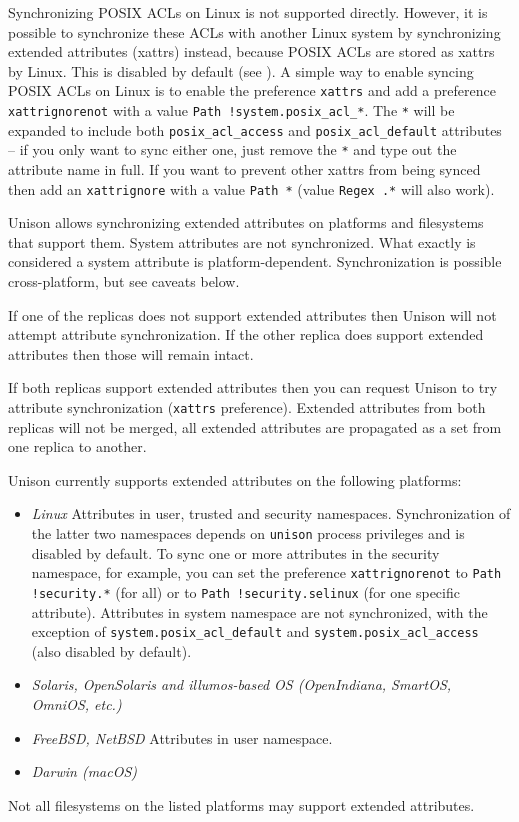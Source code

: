 \documentclass{article}
\begin{document}
Synchronizing POSIX ACLs on Linux is not supported directly. However, it is
possible to synchronize these ACLs with another Linux system by synchronizing
extended attributes (xattrs) instead, because POSIX ACLs are stored as xattrs
by Linux. This is disabled by default (see ).  A simple way to enable syncing POSIX ACLs on Linux is
to enable the preference \verb|xattrs| and add a preference
\verb|xattrignorenot| with a value \texttt{Path !system.posix\_acl\_*}.  The
\verb|*| will be expanded to include both \verb|posix_acl_access| and
\verb|posix_acl_default| attributes -- if you only want to sync either one,
just remove the \verb|*| and type out the attribute name in full.  If you want
to prevent other xattrs from being synced then add an \verb|xattrignore| with a
value \texttt{Path *} (value \texttt{Regex .*} will also work).



Unison allows synchronizing extended attributes on platforms and
filesystems that support them. System attributes are not synchronized.
What exactly is considered a system attribute is platform-dependent.
Synchronization is possible cross-platform, but see caveats below.

If one of the replicas does not support extended attributes then
Unison will not attempt attribute synchronization. If the other
replica does support extended attributes then those will remain intact.

If both replicas support extended attributes then you can request
Unison to try attribute synchronization (\verb|xattrs| preference).
Extended attributes from both replicas will not be merged, all extended
attributes are propagated as a set from one replica to another.

Unison currently supports extended attributes on the following platforms:
\begin{itemize}
\item {\em Linux}
Attributes in user, trusted and security namespaces. Synchronization of
the latter two namespaces depends on \verb|unison| process privileges
and is disabled by default. To sync one or more attributes in the security
namespace, for example, you can set the preference
\verb|xattrignorenot| to \verb|Path !security.*| (for all) or to
\verb|Path !security.selinux| (for one specific attribute).
Attributes in system namespace are not synchronized, with the exception of
\verb|system.posix_acl_default| and \verb|system.posix_acl_access| (also
disabled by default).
\item {\em Solaris, OpenSolaris and illumos-based OS (OpenIndiana, SmartOS,
  OmniOS, etc.)}
\item {\em FreeBSD, NetBSD}
Attributes in user namespace.
\item {\em Darwin (macOS)}
\end{itemize}
Not all filesystems on the listed platforms may support extended attributes.
\end{document}
